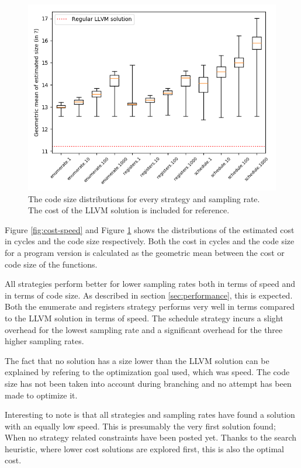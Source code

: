 \begin{figure}[h]
	\centering
	\includegraphics[width=\textwidth,height=0.5\textheight]{results/figures/cost_size}
	\caption{The code size distributions for every strategy and sampling rate. The cost of the LLVM solution is included for reference.}
	\label{fig:cost-size}
\end{figure}

Figure \ref{fig:cost-speed} and Figure \ref{fig:cost-size} shows the distributions of the
estimated cost in cycles and the code size respectively. Both the cost in cycles and the
code size for a program version is calculated as the geometric mean between the cost or
code size of the functions.

All strategies perform better for lower sampling rates both in terms of speed and in terms
of code size. As described in section \ref{sec:performance}, this is expected. Both the
enumerate and registers strategy performs very well in terms compared to the LLVM solution
in terms of speed. The schedule strategy incurs a slight overhead for the lowest sampling
rate and a significant overhead for the three higher sampling rates.

The fact that no solution has a size lower than the LLVM solution can be explained by
refering to the optimization goal used, which was speed. The code size has not been taken
into account during branching and no attempt has been made to optimize it.

Interesting to note is that all strategies and sampling rates have found a solution with
an equally low speed. This is presumably the very first solution found; When no strategy
related constraints have been posted yet. Thanks to the search heuristic, where lower cost
solutions are explored first, this is also the optimal cost.

